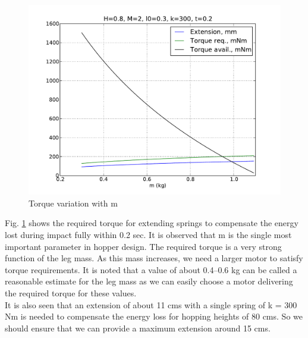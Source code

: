 \begin{figure}[!htp]
\centering
\includegraphics[scale=0.6]{fig/2mass_m.pdf}
\caption{Torque variation with m}
\label{fig:3_torque2mass}
\end{figure}

Fig. \ref{fig:3_torque2mass} shows the required torque  for extending springs to compensate the energy 
lost during impact fully within 0.2 sec. It is observed that m is the single most important parameter in 
hopper design. The required torque is a very strong function of the leg mass. As this mass increases, we 
need a larger motor to satisfy torque requirements. It is noted that a value of about 0.4--0.6 kg
can be called a reasonable estimate for the leg mass as we can easily choose a motor delivering the 
required torque for these values.\\

It is also seen that an extension of about 11 cms with a single spring of k = 300 Nm is needed to 
compensate the energy loss for hopping heights of 80 cms. So we should ensure that we can provide a 
maximum extension around 15 cms.

